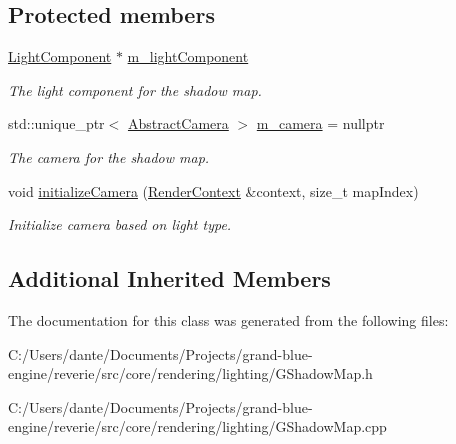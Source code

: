 \subsection*{Protected members}
\begin{DoxyCompactItemize}
\item 
\mbox{\label{classrev_1_1_shadow_map_a758aedd2c4743714b91800ec80d58619}} 
\mbox{\hyperlink{classrev_1_1_light_component}{Light\+Component}} $\ast$ \mbox{\hyperlink{classrev_1_1_shadow_map_a758aedd2c4743714b91800ec80d58619}{m\+\_\+light\+Component}}
\begin{DoxyCompactList}\small\item\em The light component for the shadow map. \end{DoxyCompactList}\item 
\mbox{\label{classrev_1_1_shadow_map_a1fbebbc9dc135135163ad5166031be5f}} 
std\+::unique\+\_\+ptr$<$ \mbox{\hyperlink{classrev_1_1_abstract_camera}{Abstract\+Camera}} $>$ \mbox{\hyperlink{classrev_1_1_shadow_map_a1fbebbc9dc135135163ad5166031be5f}{m\+\_\+camera}} = nullptr
\begin{DoxyCompactList}\small\item\em The camera for the shadow map. \end{DoxyCompactList}\item 
\mbox{\label{classrev_1_1_shadow_map_aa2dca4bf73aafda76332806e0b822474}} 
void \mbox{\hyperlink{classrev_1_1_shadow_map_aa2dca4bf73aafda76332806e0b822474}{initialize\+Camera}} (\mbox{\hyperlink{classrev_1_1_render_context}{Render\+Context}} \&context, size\+\_\+t map\+Index)
\begin{DoxyCompactList}\small\item\em Initialize camera based on light type. \end{DoxyCompactList}\end{DoxyCompactItemize}
\subsection*{Additional Inherited Members}


The documentation for this class was generated from the following files\+:\begin{DoxyCompactItemize}
\item 
C\+:/\+Users/dante/\+Documents/\+Projects/grand-\/blue-\/engine/reverie/src/core/rendering/lighting/G\+Shadow\+Map.\+h\item 
C\+:/\+Users/dante/\+Documents/\+Projects/grand-\/blue-\/engine/reverie/src/core/rendering/lighting/G\+Shadow\+Map.\+cpp\end{DoxyCompactItemize}
